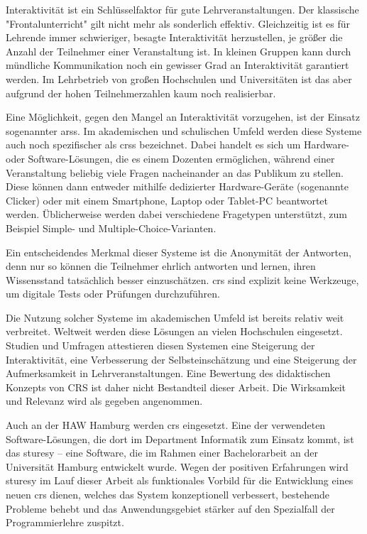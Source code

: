 Interaktivität ist ein Schlüsselfaktor für gute Lehrveranstaltungen. Der klassische "Frontalunterricht" gilt nicht mehr als sonderlich effektiv. Gleichzeitig ist es für Lehrende immer schwieriger, besagte Interaktivität herzustellen, je größer die Anzahl der Teilnehmer einer Veranstaltung ist. In kleinen Gruppen kann durch mündliche Kommunikation noch ein gewisser Grad an Interaktivität garantiert werden. Im Lehrbetrieb von großen Hochschulen und Universitäten ist das aber aufgrund der hohen Teilnehmerzahlen kaum noch realisierbar.

Eine Möglichkeit, gegen den Mangel an Interaktivität vorzugehen, ist der Einsatz sogenannter \acp{ars}. Im akademischen und schulischen Umfeld werden diese Systeme auch noch spezifischer als \acp{crs} bezeichnet. Dabei handelt es sich um Hardware- oder Software-Lösungen, die es einem Dozenten ermöglichen, während einer Veranstaltung beliebig viele Fragen nacheinander an das Publikum zu stellen. Diese können dann entweder mithilfe dedizierter Hardware-Geräte (sogenannte Clicker) oder mit einem Smartphone, Laptop oder Tablet-PC beantwortet werden. Üblicherweise werden dabei verschiedene Fragetypen unterstützt, zum Beispiel Simple- und Multiple-Choice-Varianten.

Ein entscheidendes Merkmal dieser Systeme ist die Anonymität der Antworten, denn nur so können die Teilnehmer ehrlich antworten und lernen, ihren Wissensstand tatsächlich besser einzuschätzen. \ac{crs} sind explizit keine Werkzeuge, um digitale Tests oder Prüfungen durchzuführen.

Die Nutzung solcher Systeme im akademischen Umfeld ist bereits relativ weit verbreitet. Weltweit werden diese Lösungen an vielen Hochschulen eingesetzt. Studien und Umfragen attestieren diesen Systemen eine Steigerung der Interaktivität, eine Verbesserung der Selbsteinschätzung und eine Steigerung der Aufmerksamkeit in Lehrveranstaltungen\cite{web:wisconsin, web:tenyears}. Eine Bewertung des didaktischen Konzepts von CRS ist daher nicht Bestandteil dieser Arbeit. Die Wirksamkeit und Relevanz wird als gegeben angenommen.

Auch an der HAW Hamburg werden \ac{crs} eingesetzt. Eine der verwendeten Software-Lösungen, die dort im Department Informatik zum Einsatz kommt, ist das \ac{sturesy} – eine Software, die im Rahmen einer Bachelorarbeit an der Universität Hamburg entwickelt wurde\cite{sturesy}. Wegen der positiven Erfahrungen wird \ac{sturesy} im Lauf dieser Arbeit als funktionales Vorbild für die Entwicklung eines neuen \ac{crs} dienen, welches das System konzeptionell verbessert, bestehende Probleme behebt und das Anwendungsgebiet stärker auf den Spezialfall der Programmierlehre zuspitzt.